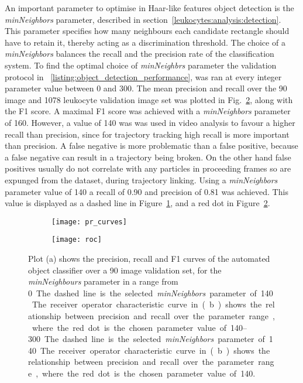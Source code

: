 An important parameter to optimise in Haar-like features object detection is the \emph{minNeighbors} parameter, described in section~\ref{leukocytes:analysis:detection}. This parameter specifies how many neighbours each candidate rectangle should have to retain it, thereby acting as a discrimination threshold. The choice of a \emph{minNeighbors} balances the recall and the precision rate of the classification system. To find the optimal choice of \emph{minNeighbrs} parameter the validation protocol in ~\ref{listing:object_detection_performance}, was ran at every integer parameter value between 0 and 300. The mean precision and recall over the 90 image and 1078 leukocyte validation image set was plotted in Fig.~\ref{figure:pr_roc:roc}, along with the F1 score. A maximal F1 score was achieved with a \emph{minNeighbors} parameter of 160. However, a value of 140 was was used in video analysis to favour a higher recall than precision, since for trajectory tracking high recall is more important than precision. A false negative is more problematic than a false positive, because a false negative can result in a trajectory being broken. On the other hand false positives usually do not correlate with any particles in proceeding frames so are expunged from the dataset, during trajectory linking. Using a \emph{minNeighbors} parameter value of 140 a recall of 0.90 and precision of 0.81 was achieved. This value is displayed as a dashed line in Figure~\ref{figure:pr_roc:pr_curve}, and a red dot in Figure~\ref{figure:pr_roc:roc}.

\begin{figure}[htbp]{}
	\centering
	\begin{subfigure}[b]{0.73\linewidth}
		\texttt{[image: pr\_curves]}
		\caption{}
		\label{figure:pr_roc:pr_curve}
	\end{subfigure}
	\begin{subfigure}[b]{0.73\linewidth}
		\texttt{[image: roc]}
		\caption{}
		\label{figure:pr_roc:roc}
	\end{subfigure}
\caption{Plot (a) shows the precision, recall and F1 curves of the automated object classifier over a 90 image validation set, for the \emph{minNeighbours} parameter in a range from \SIrange{0}{300}. The dashed line is the selected \emph{minNeighbors} parameter of 140. The receiver operator characteristic curve in (b) shows the relationship between precision and recall over the parameter range, where the red dot is the chosen parameter value of 140.}
\label{figure:pr_roc}
\end{figure}

